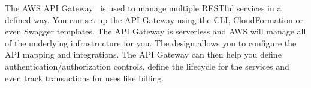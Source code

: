 The AWS API Gateway~\cite{hid-sp18-518-AWS-APIGateway} is used to manage
multiple RESTful services in a defined way. You can set up the API Gateway
using the CLI, CloudFormation or even Swagger templates. The API Gateway is
serverless and AWS will manage all of the underlying infrastructure for you. 
The design allows you to configure the API mapping and integrations. The API 
Gateway can then help you define authentication/authorization controls, 
define the lifecycle for the services and even track transactions for uses
like billing.










